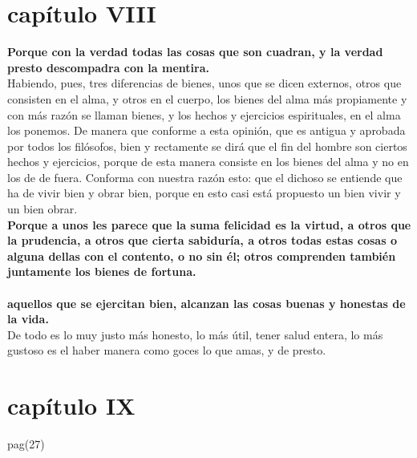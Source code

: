 \begin{multicols}{2}
\section*{capítulo VIII}
\textbf{Porque con la verdad todas las cosas que son cuadran, y la verdad presto descompadra con la mentira.}\\
Habiendo, pues, tres diferencias de bienes, unos que se dicen externos, otros que consisten en el alma, y otros en el cuerpo, los bienes del alma más propiamente y con más razón se llaman bienes, y los hechos y ejercicios espirituales, en el alma los ponemos. De manera que conforme a esta opinión, que es antigua y aprobada por todos los filósofos, bien y rectamente se dirá que el fin del hombre son ciertos hechos y ejercicios, porque de esta manera consiste en los bienes del alma y no en los de de fuera. Conforma con nuestra razón esto: que el dichoso se entiende que ha de vivir bien y obrar bien, porque en esto casi está propuesto un bien vivir y un bien obrar.\\
\textbf{Porque a unos les parece que la suma felicidad es la virtud, a otros que la prudencia, a otros que cierta sabiduría, a otros todas estas cosas o alguna dellas con el contento, o no sin él; otros comprenden también juntamente los bienes de fortuna.}\\\\
\textbf{aquellos que se ejercitan bien, alcanzan las cosas buenas y honestas de la vida.}\\
De todo es lo muy justo más honesto, lo más útil, tener salud entera, lo más gustoso es el haber manera como goces lo que amas, y de presto.

\section*{capítulo IX}
pag(27)

\end{multicols}

